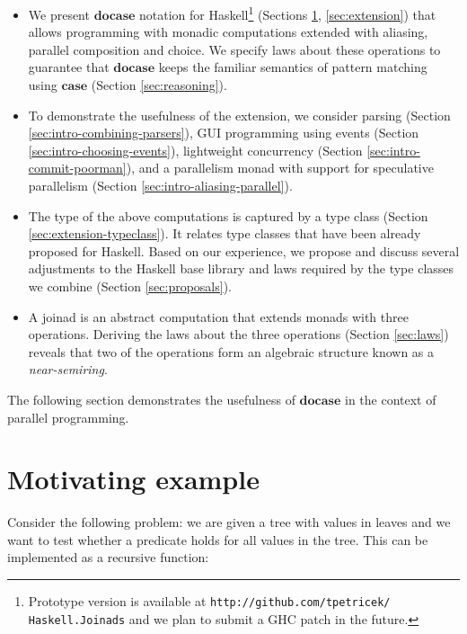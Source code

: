 \documentclass{sigplanconf}
\begin{document}
\begin{itemize}
\item We present \ensuremath{\mathbf{docase}} notation for Haskell\footnote{Prototype version is available at 
  \texttt{http://github.com/tpetricek/ Haskell.Joinads} and we plan to submit a GHC patch in the 
  future. } (Sections \ref{sec:motivation}, \ref{sec:extension}) 
  that allows programming with monadic computations extended with aliasing, parallel composition
  and choice. We specify laws about these operations to guarantee that \ensuremath{\mathbf{docase}} keeps the familiar 
  semantics of pattern matching using \ensuremath{\mathbf{case}} (Section \ref{sec:reasoning}).

\item To demonstrate the usefulness of the extension, we consider parsing
  (Section \ref{sec:intro-combining-parsers}), GUI programming using events
  (Section \ref{sec:intro-choosing-events}), lightweight concurrency
  (Section \ref{sec:intro-commit-poorman}), and a parallelism monad with
  support for speculative parallelism (Section \ref{sec:intro-aliasing-parallel}).

\item The type of the above computations is captured by a  type class (Section 
  \ref{sec:extension-typeclass}). It relates type classes that have been already proposed for 
  Haskell. Based on our experience, we propose and discuss several adjustments to the Haskell base 
  library and laws required by the type classes we combine (Section \ref{sec:proposals}). 

\item A joinad is an abstract computation that extends monads with three operations.
  Deriving the laws about the three operations (Section \ref{sec:laws}) reveals that two of
  the operations form an algebraic structure known as a \textit{near-semiring}.

\end{itemize}
The following section demonstrates the usefulness of \ensuremath{\mathbf{docase}} in the context 
of parallel programming.


\section{Motivating example}
\label{sec:motivation}

Consider the following problem: we are given a tree with values in leaves and we want to test
whether a predicate holds for all values in the tree. This can be implemented as a recursive function:
\end{document}
